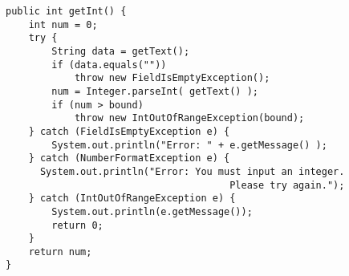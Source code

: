 \begin{ANS}
\begin{jjjlisting}
\begin{lstlisting}
public int getInt() {
    int num = 0;
    try {
        String data = getText();
        if (data.equals(""))
            throw new FieldIsEmptyException();
        num = Integer.parseInt( getText() );
        if (num > bound)
            throw new IntOutOfRangeException(bound);
    } catch (FieldIsEmptyException e) {
        System.out.println("Error: " + e.getMessage() );
    } catch (NumberFormatException e) {
      System.out.println("Error: You must input an integer.  
                                       Please try again.");
    } catch (IntOutOfRangeException e) {
        System.out.println(e.getMessage());
        return 0;
    }
    return num;
}
\end{lstlisting}
\end{jjjlisting}

\end{ANS}


